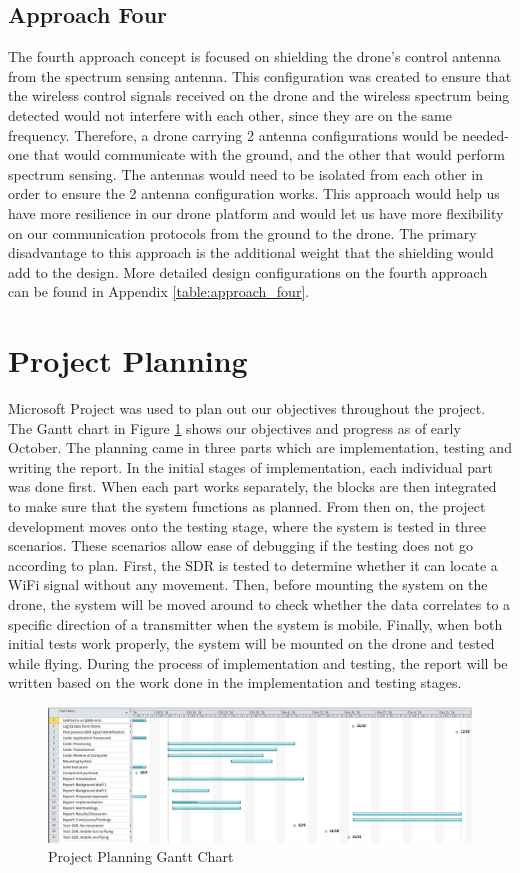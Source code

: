 \subsection{Approach Four}
The fourth approach concept is focused on shielding the drone’s control antenna from the spectrum sensing antenna. This configuration was created to ensure that the wireless control signals received on the drone and the wireless spectrum being detected would not interfere with each other, since they are on the same frequency. Therefore, a drone carrying 2 antenna configurations would be needed- one that would communicate with the ground, and the other that would perform spectrum sensing. The antennas would need to be isolated from each other in order to ensure the 2 antenna configuration works. This approach would help us have more resilience in our drone platform and would let us have more flexibility on our communication protocols from the ground to the drone. The primary disadvantage to this approach is the additional weight that the shielding would add to the design. More detailed design configurations on the fourth approach can be found in Appendix \ref{table:approach_four}.

\section{Project Planning}
Microsoft Project was used to plan out our objectives throughout the project. The Gantt chart in Figure \ref{fig:gantt_chart} shows our objectives and progress as of early October. The planning came in three parts which are implementation, testing and writing the report. In the initial stages of implementation, each individual part was done first. When each part works separately, the blocks are then integrated to make sure that the system functions as planned. From then on, the project development moves onto the testing stage, where the system is tested in three scenarios. These scenarios allow ease of debugging if the testing does not go according to plan. First, the SDR is tested to determine whether it can locate a WiFi signal without any movement. Then, before mounting the system on the drone, the system will be moved around to check whether the data correlates to a specific direction of a transmitter when the system is mobile. Finally, when both initial tests work properly, the system will be mounted on the drone and tested while flying. During the process of implementation and testing, the report will be written based on the work done in the implementation and testing stages.
\begin{figure}[ht]
\centering
\includegraphics[width=1.0\textwidth]{img/oct_gantt_chart.png}
\caption{Project Planning Gantt Chart}
\label{fig:gantt_chart}
\end{figure}
